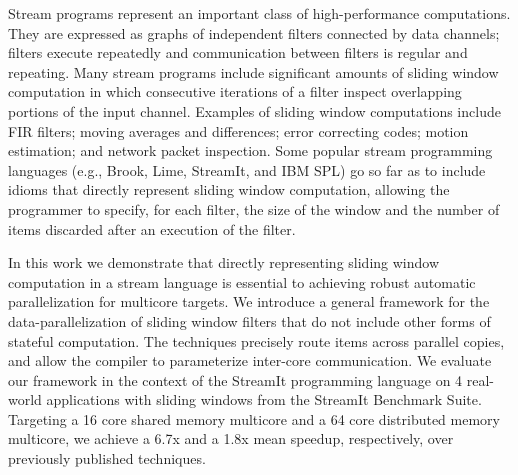 Stream programs represent an important class of high-performance
computations. They are expressed as graphs of independent filters
connected by data channels; filters execute repeatedly and
communication between filters is regular and repeating.  Many stream
programs include significant amounts of sliding window computation in
which consecutive iterations of a filter inspect overlapping portions
of the input channel.  Examples of sliding window computations include
FIR filters; moving averages and differences; error correcting
codes; motion estimation; and network packet inspection.  Some popular
stream programming languages (e.g., Brook, Lime, StreamIt, and IBM
SPL) go so far as to include idioms that directly represent sliding
window computation, allowing the programmer to specify, for each
filter, the size of the window and the number of items discarded after
an execution of the filter.

In this work we demonstrate that directly representing sliding window
computation in a stream language is essential to achieving robust
automatic parallelization for multicore targets. We introduce a
general framework for the data-parallelization of sliding window
filters that do not include other forms of stateful computation.  The
techniques precisely route items across parallel copies, and allow the
compiler to parameterize inter-core communication.  We evaluate our
framework in the context of the StreamIt programming language on 4
real-world applications with sliding windows from the StreamIt
Benchmark Suite.  Targeting a 16 core shared memory multicore and a 64
core distributed memory multicore, we achieve a 6.7x and a 1.8x mean
speedup, respectively, over previously published techniques.
